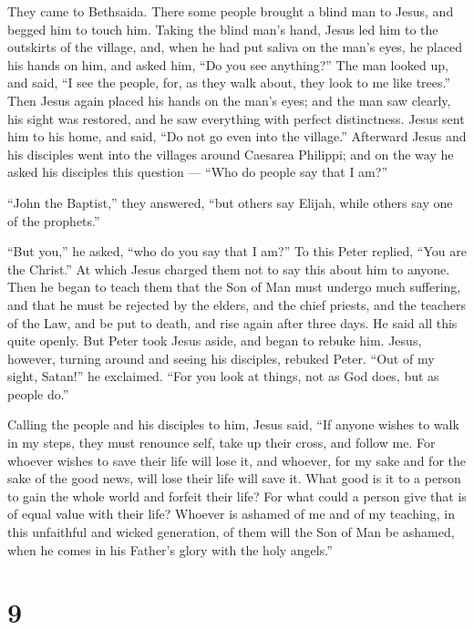  They came to Bethsaida. There some people brought a blind
man to Jesus, and begged him to touch him.  Taking the
blind man's hand, Jesus led him to the outskirts of the village, and,
when he had put saliva on the man's eyes, he placed his hands on him,
and asked him, ``Do you see anything?''  The man looked up,
and said, ``I see the people, for, as they walk about, they look to me
like trees.''  Then Jesus again placed his hands on the
man's eyes; and the man saw clearly, his sight was restored, and he saw
everything with perfect distinctness.  Jesus sent him to
his home, and said, ``Do not go even into the village.'' 
Afterward Jesus and his disciples went into the villages around Caesarea
Philippi; and on the way he asked his disciples this question --- ``Who
do people say that I am?''

 ``John the Baptist,'' they answered, ``but others say
Elijah, while others say one of the prophets.''

 ``But you,'' he asked, ``who do you say that I am?'' To
this Peter replied, ``You are the Christ.''  At which Jesus
charged them not to say this about him to anyone.  Then he
began to teach them that the Son of Man must undergo much suffering, and
that he must be rejected by the elders, and the chief priests, and the
teachers of the Law, and be put to death, and rise again after three
days.  He said all this quite openly. But Peter took Jesus
aside, and began to rebuke him.  Jesus, however, turning
around and seeing his disciples, rebuked Peter. ``Out of my sight,
Satan!'' he exclaimed. ``For you look at things, not as God does, but as
people do.''

 Calling the people and his disciples to him, Jesus said,
``If anyone wishes to walk in my steps, they must renounce self, take up
their cross, and follow me.  For whoever wishes to save
their life will lose it, and whoever, for my sake and for the sake of
the good news, will lose their life will save it.  What
good is it to a person to gain the whole world and forfeit their life?
 For what could a person give that is of equal value with
their life?  Whoever is ashamed of me and of my teaching,
in this unfaithful and wicked generation, of them will the Son of Man be
ashamed, when he comes in his Father's glory with the holy angels.''

\hypertarget{section-8}{%
\section{9}\label{section-8}}

